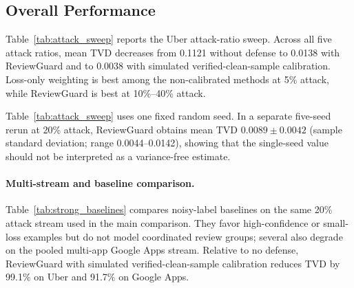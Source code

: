 \documentclass[runningheads]{llncs}
\begin{document}
\subsection{Overall Performance}

Table~\ref{tab:attack_sweep} reports the Uber attack-ratio sweep. Across all five attack ratios, mean TVD decreases from 0.1121 without defense to 0.0138 with ReviewGuard and to 0.0038 with simulated verified-clean-sample calibration. Loss-only weighting is best among the non-calibrated methods at 5\% attack, while ReviewGuard is best at 10\%--40\% attack.

\begin{table}
\centering
\small
\caption{Uber attack-ratio sweep. Lower TVD is better. Bold marks the best base method without verified clean samples; underlined calibration results use additional simulated verified-clean-sample information and are reported separately.}
\label{tab:attack_sweep}
\end{table}

Table~\ref{tab:attack_sweep} uses one fixed random seed. In a separate five-seed rerun at 20\% attack, ReviewGuard obtains mean TVD \(0.0089\pm0.0042\) (sample standard deviation; range 0.0044--0.0142), showing that the single-seed value should not be interpreted as a variance-free estimate.

\paragraph{Multi-stream and baseline comparison.}
Table~\ref{tab:strong_baselines} compares noisy-label baselines on the same 20\% attack stream used in the main comparison. They favor high-confidence or small-loss examples but do not model coordinated review groups; several also degrade on the pooled multi-app Google Apps stream. Relative to no defense, ReviewGuard with simulated verified-clean-sample calibration reduces TVD by 99.1\% on Uber and 91.7\% on Google Apps.
\end{document}
